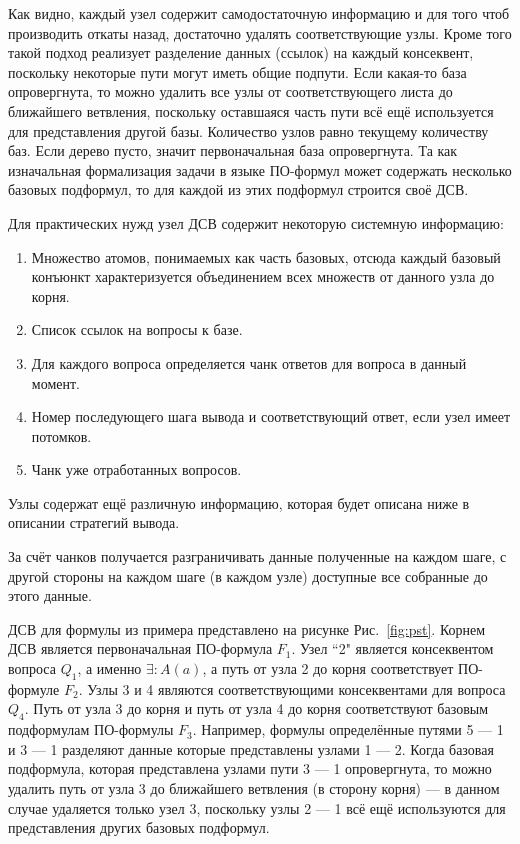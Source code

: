 Как видно, каждый узел содержит самодостаточную информацию и для того чтоб производить откаты назад, достаточно удалять соответствующие узлы.
Кроме того такой подход реализует разделение данных (ссылок) на каждый консеквент, поскольку некоторые пути могут иметь общие подпути.
Если какая-то база опровергнута, то можно удалить все узлы от соответствующего листа до ближайшего ветвления, поскольку оставшаяся часть пути всё ещё используется для представления другой базы. Количество узлов равно текущему количеству баз. Если дерево пусто, значит первоначальная база опровергнута.
Та как изначальная формализация задачи в языке ПО-формул может содержать несколько базовых подформул, то для каждой из этих подформул строится своё ДСВ.

Для практических нужд узел ДСВ содержит некоторую системную информацию:
\begin{enumerate}
\item Множество атомов, понимаемых как часть базовых, отсюда каждый базовый конъюнкт характеризуется объединением всех множеств от данного узла до корня.
\item Список ссылок на вопросы к базе.
\item Для каждого вопроса определяется чанк ответов для вопроса в данный момент.
\item Номер последующего шага вывода и соответствующий ответ, если узел имеет потомков.
\item Чанк уже отработанных вопросов.
\end{enumerate}

Узлы содержат ещё различную информацию, которая будет описана ниже в описании стратегий вывода.

За счёт чанков получается разграничивать данные полученные на каждом шаге, с другой стороны на каждом шаге (в каждом узле) доступные все собранные до этого данные.

ДСВ для формулы из примера представлено на рисунке Рис.~\ref{fig:pst}.
Корнем ДСВ является первоначальная ПО-формула $F_1$. Узел ``2" является консеквентом вопроса $Q_1$, а именно $\exists\colon A(a)$, а путь от узла 2 до корня соответствует ПО-формуле $F_2$. Узлы 3 и 4 являются соответствующими консеквентами для вопроса $Q_4$. Путь от узла 3 до корня и путь от узла 4 до корня соответствуют базовым подформулам ПО-формулы $F_3$. Например, формулы определённые путями 5 --- 1 и 3 --- 1 разделяют данные которые представлены узлами 1 --- 2. Когда базовая подформула, которая представлена узлами пути 3 --- 1 опровергнута, то можно удалить путь от узла 3 до ближайшего ветвления (в сторону корня) --- в данном случае удаляется только узел 3, поскольку узлы 2 --- 1 всё ещё используются для представления других базовых подформул.

